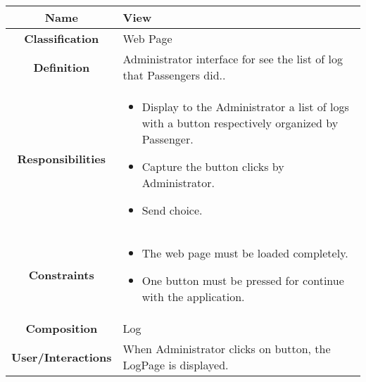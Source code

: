 \documentclass[11pt, a4paper,titlepage]{article}
\begin{document}
\begin{enumerate}
\begin{tabularx}{\textwidth}{| c | X |}
	\hline
	\textbf{Name} & 
	View
	\\
	\hline
	\textbf{Classification} & 
	Web Page
	\\
	\hline
	\textbf{Definition} & 
	Administrator interface for see the list of log  that Passengers did..\\
	\hline
	\textbf{Responsibilities} &
	\begin{itemize}
		\item Display to the Administrator a list of logs with a button respectively organized by Passenger.
		\item  Capture the button clicks by Administrator.
		\item Send choice.
	\end{itemize}
	\\
	\hline
	\textbf{Constraints} & 
	\begin{itemize}
		\item  The web page must be loaded completely.
		\item One button must be pressed for continue with the application.
	\end{itemize}
	\\
	\hline
	\textbf{Composition} & 
	Log
	\\
	\hline
	\textbf{User/Interactions} & 
	When Administrator clicks on button, the LogPage is displayed.
	\\
	\hline	
\end{tabularx}


\end{enumerate}
\end{document}
